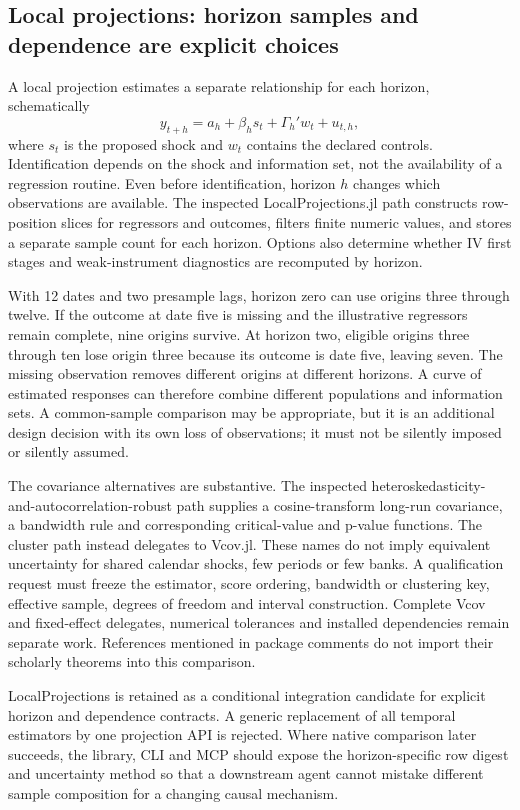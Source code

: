 \subsection{Local projections: horizon samples and dependence are explicit choices}

A local projection estimates a separate relationship for each horizon, schematically
\[
 y_{t+h}=a_h+\beta_h s_t+\Gamma_h'w_t+u_{t,h},
\]
where $s_t$ is the proposed shock and $w_t$ contains the declared controls. Identification depends on the shock and information set, not the availability of a regression routine. Even before identification, horizon $h$ changes which observations are available. The inspected LocalProjections.jl path constructs row-position slices for regressors and outcomes, filters finite numeric values, and stores a separate sample count for each horizon. Options also determine whether IV first stages and weak-instrument diagnostics are recomputed by horizon.~\citep{exec25_odyn_lp}

With 12 dates and two presample lags, horizon zero can use origins three through twelve. If the outcome at date five is missing and the illustrative regressors remain complete, nine origins survive. At horizon two, eligible origins three through ten lose origin three because its outcome is date five, leaving seven. The missing observation removes different origins at different horizons. A curve of estimated responses can therefore combine different populations and information sets. A common-sample comparison may be appropriate, but it is an additional design decision with its own loss of observations; it must not be silently imposed or silently assumed.~\citep{exec25_odyn_lp,exec25_odyn_choice}

The covariance alternatives are substantive. The inspected heteroskedasticity-and-autocorrelation-robust path supplies a cosine-transform long-run covariance, a bandwidth rule and corresponding critical-value and p-value functions. The cluster path instead delegates to Vcov.jl. These names do not imply equivalent uncertainty for shared calendar shocks, few periods or few banks. A qualification request must freeze the estimator, score ordering, bandwidth or clustering key, effective sample, degrees of freedom and interval construction. Complete Vcov and fixed-effect delegates, numerical tolerances and installed dependencies remain separate work. References mentioned in package comments do not import their scholarly theorems into this comparison.

LocalProjections is retained as a conditional integration candidate for explicit horizon and dependence contracts. A generic replacement of all temporal estimators by one projection API is rejected. Where native comparison later succeeds, the library, CLI and MCP should expose the horizon-specific row digest and uncertainty method so that a downstream agent cannot mistake different sample composition for a changing causal mechanism.~\citep{exec25_odyn_lp,exec25_odyn_choice}

